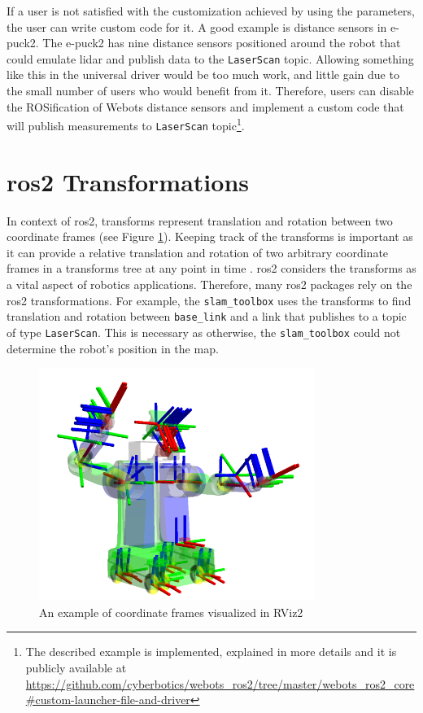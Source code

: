 If a user is not satisfied with the customization achieved by using the parameters, the user can write custom code for it.
A good example is distance sensors in e-puck2.
The e-puck2 has nine distance sensors positioned around the robot that could emulate \ac{lidar} and publish data to the \texttt{LaserScan} topic.
Allowing something like this in the universal driver would be too much work, and little gain due to the small number of users who would benefit from it.
Therefore, users can disable the ROSification of Webots distance sensors and implement a custom code that will publish measurements to \texttt{LaserScan} topic\footnote{The described example is implemented, explained in more details and it is publicly available at \url{https://github.com/cyberbotics/webots_ros2/tree/master/webots_ros2_core\#custom-launcher-file-and-driver}}.

\section{\ac{ros2} Transformations}

In context of \ac{ros2}, transforms represent translation and rotation between two coordinate frames (see Figure \ref{fig:generalization:tf2_robot}).
Keeping track of the transforms is important as it can provide a relative translation and rotation of two arbitrary coordinate frames in a transforms tree at any point in time \cite{foote_tf_2013}. 
\ac{ros2} considers the transforms as a vital aspect of robotics applications.
Therefore, many \ac{ros2} packages rely on the \ac{ros2} transformations.
For example, the \texttt{slam\_toolbox} uses the transforms to find translation and rotation between \texttt{base\_link} and a link that publishes to a topic of type \texttt{LaserScan}.
This is necessary as otherwise, the \texttt{slam\_toolbox} could not determine the robot's position in the map.

\begin{figure}[H]
    \centering
    \includegraphics[width=0.8\textwidth]{generalization/figures/tf2_robot.png}
    \caption{An example of coordinate frames visualized in RViz2 \cite{foote_tf_2013}}
    \label{fig:generalization:tf2_robot}
\end{figure}

